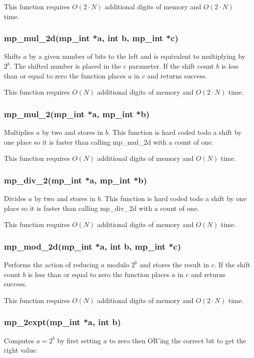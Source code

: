 \documentclass{article}
\begin{document}
This function requires $O(2 \cdot N)$ additional digits of memory and $O(2 \cdot N)$ time.

\subsubsection{mp\_mul\_2d(mp\_int *a, int b, mp\_int *c)}
Shifts $a$ by a given number of bits to the left and is equivalent to multiplying by $2^b$.  The shifted number
is placed in the $c$ parameter.  If the shift count $b$ is less than or equal to zero the function places $a$
in $c$ and returns success.  

This function requires $O(N)$ additional digits of memory and $O(2 \cdot N)$ time.

\subsubsection{mp\_mul\_2(mp\_int *a, mp\_int *b)}
Multiplies $a$ by two and stores in $b$.  This function is hard coded todo a shift by one place so it is faster
than calling mp\_mul\_2d with a count of one.  

This function requires $O(N)$ additional digits of memory and $O(N)$ time.

\subsubsection{mp\_div\_2(mp\_int *a, mp\_int *b)}
Divides $a$ by two and stores in $b$.  This function is hard coded todo a shift by one place so it is faster
than calling mp\_div\_2d with a count of one.

This function requires $O(N)$ additional digits of memory and $O(N)$ time.

\subsubsection{mp\_mod\_2d(mp\_int *a, int b, mp\_int *c)}
Performs the action of reducing $a$ modulo $2^b$ and stores the result in $c$.  If the shift count $b$ is less than 
or equal to zero the function places $a$ in $c$ and returns success.  

This function requires $O(N)$ additional digits of memory and $O(2 \cdot N)$ time.

\subsubsection{mp\_2expt(mp\_int *a, int b)}
Computes $a = 2^b$ by first setting $a$ to zero then OR'ing the correct bit to get the right value.
\end{document}

